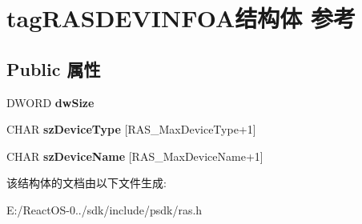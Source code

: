 \hypertarget{structtag_r_a_s_d_e_v_i_n_f_o_a}{}\section{tag\+R\+A\+S\+D\+E\+V\+I\+N\+F\+O\+A结构体 参考}
\label{structtag_r_a_s_d_e_v_i_n_f_o_a}
\subsection*{Public 属性}
\begin{DoxyCompactItemize}
\item 
\mbox{\label{structtag_r_a_s_d_e_v_i_n_f_o_a_ac6e8056d5db0c7924b78d78120dd8f9f}} 
D\+W\+O\+RD {\bfseries dw\+Size}
\item 
\mbox{\label{structtag_r_a_s_d_e_v_i_n_f_o_a_a5fa8f7ca39df18760f39a2af113ca0b7}} 
C\+H\+AR {\bfseries sz\+Device\+Type} \mbox{[}R\+A\+S\+\_\+\+Max\+Device\+Type+1\mbox{]}
\item 
\mbox{\label{structtag_r_a_s_d_e_v_i_n_f_o_a_ad8ca3769e8e11e9bfed8efc2afd9da23}} 
C\+H\+AR {\bfseries sz\+Device\+Name} \mbox{[}R\+A\+S\+\_\+\+Max\+Device\+Name+1\mbox{]}
\end{DoxyCompactItemize}


该结构体的文档由以下文件生成\+:\begin{DoxyCompactItemize}
\item 
E\+:/\+React\+O\+S-\/0../sdk/include/psdk/ras.\+h\end{DoxyCompactItemize}
